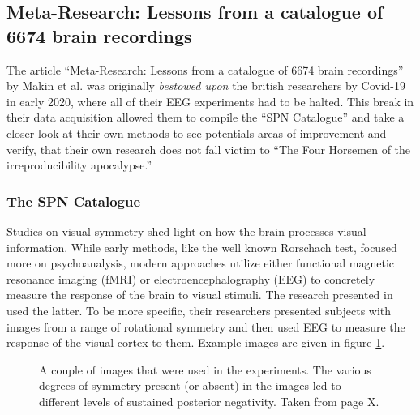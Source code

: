 \documentclass{article}
\begin{document}
\subsection{Meta-Research: Lessons from a catalogue of 6674 brain recordings}

The article ``Meta-Research: Lessons from a catalogue of 6674 brain recordings'' by Makin et al. \cite{brainrecordings} was originally \textit{bestowed upon} the british researchers by Covid-19 in early 2020, where all of their EEG experiments had to be halted. This break in their data acquisition allowed them to compile the ``SPN Catalogue'' and take a closer look at their own methods to see potentials areas of improvement and verify, that their own research does not fall victim to ``The Four Horsemen of the irreproducibility apocalypse.'' \\
\subsubsection{The SPN Catalogue}
Studies on visual symmetry shed light on how the brain processes visual information. While early methods, like the well known Rorschach test, focused more on psychoanalysis, modern approaches utilize either functional magnetic resonance imaging (fMRI) or electroencephalography (EEG) to concretely measure the response of the brain to visual stimuli. The research presented in \cite{brainrecordings} used the latter. To be more specific, their researchers presented subjects with images from a range of rotational symmetry and then used EEG to measure the response of the visual cortex to them. Example images are given in figure \ref{fig:symmetry}. 

\begin{figure}[h]
    \centering
    \caption{A couple of images that were used in the experiments. The various degrees of symmetry present (or absent) in the images led to different levels of sustained posterior negativity. Taken from \cite{brainrecordings} page X.}
    \label{fig:symmetry}
\end{figure}
\end{document}
